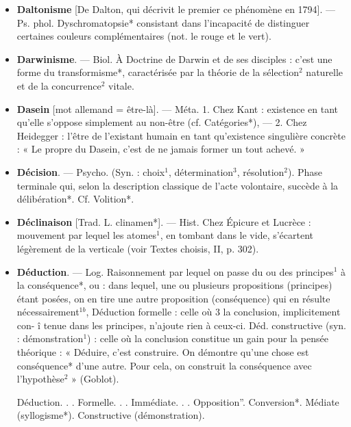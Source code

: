 
	\begin{itemize}[leftmargin=1cm, label=, itemsep=1pt]

\item {\bf Daltonisme} [De Dalton, qui décrivit
le premier ce phénomène en 1794].
— Ps. phol. Dyschromatopsie* consistant dans l'incapacité de distinguer certaines couleurs complémentaires (not. le rouge et le vert).

\item {\bf Darwinisme}. — Biol. À Doctrine de
Darwin et de ses disciples : c'est
une forme du transformisme*, caractérisée par la théorie de la sélection$^2$
naturelle et de la concurrence$^2$
vitale.

\item {\bf Dasein} [mot allemand = être-là]. —
Méta. 1. Chez Kant : existence en
tant qu’elle s’oppose simplement au
non-être (cf. Catégories*), — 2. Chez
Heidegger : l'être de l'existant
humain en tant qu’existence singulière concrète : « Le propre du Dasein,
c’est de ne jamais former un tout
achevé. »

\item {\bf Décision}. — Psycho. (Syn. : choix$^1$,
détermination$^3$, résolution$^2$). Phase
terminale qui, selon la description
classique de l’acte volontaire, succède à la délibération*. Cf. Volition*.

\item {\bf Déclinaison} [Trad. L. clinamen*]. —
Hist. Chez Épicure et Lucrèce : mouvement par lequel les atomes$^1$, en
tombant dans le vide, s’écartent
légèrement de la verticale (voir
Textes choisis, II, p. 302).

\item {\bf Déduction}. — Log. Raisonnement
par lequel on passe du ou des principes$^1$ à la conséquence*, ou : dans
lequel, une ou plusieurs propositions (principes) étant posées, on en
tire une autre proposition (conséquence) qui en résulte nécessairement$^{1b}$, Déduction formelle : celle où 3
la conclusion, implicitement con- î
tenue dans les principes, n’ajoute
rien à ceux-ci. Déd. constructive
(syn. : démonstration$^1$) : celle où la
conclusion constitue un gain pour la
pensée théorique : « Déduire, c’est
construire. On démontre qu’une
chose est conséquence* d’une autre.
Pour cela, on construit la conséquence avec l'hypothèse$^2$ » (Goblot).

Déduction. . .
  Formelle. . .
    Immédiate. . .
      Opposition”. 
      Conversion*.
    Médiate (syllogisme*).
 Constructive (démonstration).


\end{itemize}
